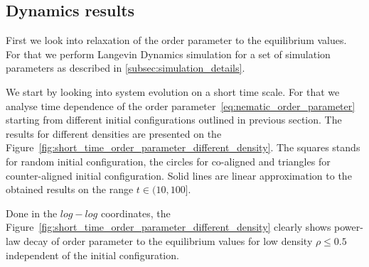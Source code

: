 \subsection{Dynamics results}
\label{subsec:molecular_dynamics_results}

First we look into relaxation of the order parameter to the equilibrium values. For that we perform Langevin Dynamics simulation for a set of simulation parameters as described in \ref{subsec:simulation_details}.

We start by looking into system evolution on a short time scale. For that we analyse time dependence of the order parameter~\eqref{eq:nematic_order_parameter} starting from different initial configurations outlined in previous section. The results for different densities are presented on the Figure~\ref{fig:short_time_order_parameter_different_density}. The squares stands for random initial configuration, the circles for co-aligned and triangles for counter-aligned initial configuration. Solid lines are linear approximation to the obtained results on the range $t \in (10, 100]$. 

Done in the $log-log$ coordinates, the Figure~\ref{fig:short_time_order_parameter_different_density} clearly shows power-law decay of order parameter to the equilibrium values for low density $\rho \le 0.5$ independent of the initial configuration.

